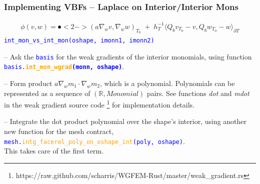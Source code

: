 \documentclass[compress]{beamer}
\begin{document}
\begin{frame}
  \frametitle{Implementing VBFs -- Laplace on Interior/Interior Mons}
  \vspace{-.56cm}
  \begin{align*}
    \mathfrak \phi(v,w) = \spot<2->{(a \nabla_w v,\nabla_w w)_{\scriptscriptstyle T_0}} \;+\;
    h_T^{-1}\langle Q_b v_{\scriptscriptstyle T_0} - v,Q_b w_{\scriptscriptstyle T_0} - w \rangle_{\partial T}
  \end{align*}
  \texttt{\textcolor{blue}{int\_mon\_vs\_int\_mon(oshape, imonn1, imonn2)}}\\
  \pause
  \vspace{.35cm}
  \uncover<+-> {
  -- Ask the \texttt{\textcolor{blue}{basis}} for the weak gradients of the interior monomials, using
  function {\small \texttt{\textcolor{blue}{basis.\textbf{\textcolor{orange}{int\_mon\_wgrad}(monn, oshape)}}}}.
      
  \vspace{.1cm}
  \uncover<+-> {
  -- Form product $a \nabla_w m_1 \cdot \nabla_w m_2$, which is a polynomial. Polynomials can be represented as a sequence
  of $(\mathbb{R}, Monomial)$ pairs. See functions \emph{dot} and \emph{mdot} in the weak gradient source code
  \footnote{https://raw.github.com/scharris/WGFEM-Rust/master/weak\_gradient.rs} for implementation details.
       
  \vspace{.1cm}
  \uncover<+-> {
  -- Integrate the dot product polynomial over the shape's interior, using another new function for the mesh contract,\\
  \texttt{\small \textcolor{blue}{mesh.\textcolor{orange}{intg\_facerel\_poly\_on\_oshape\_int}(poly, oshape)}}.\\

  \vspace{0.4cm}
  This takes care of the first term.
  }}}
\end{frame}
\end{document}
